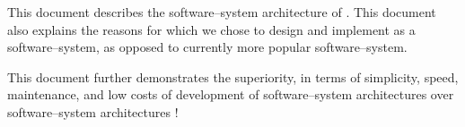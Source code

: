 \begin{center}
\parbox{42em}{
This document describes the \thickclient
software--system architecture of \yerotherpblack.
This document also explains the reasons for
which we chose to design and implement
\yerotherpblack as a \thickclient software--system,
as opposed to currently more popular
\webbrowserbased software--system.
\newline

\textcolor{purplish}{
This document further demonstrates the superiority,
in terms of simplicity, speed, maintenance, and
low costs of development of \thickclient
software--system architectures over \webbrowserbased
software--system architectures !}
}
\end{center}